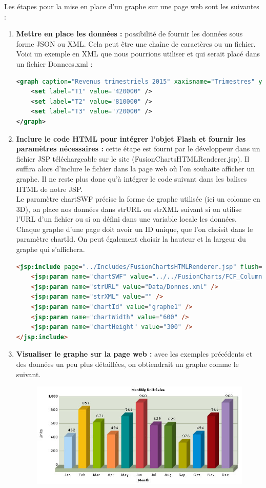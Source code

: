 Les étapes pour la mise en place d'un graphe sur une page web sont les suivantes :
\begin{enumerate}
 \item \textbf{Mettre en place les données :} possibilité de fournir les données sous forme JSON ou XML. Cela peut être une chaîne de caractères ou un fichier. Voici un exemple en XML que nous pourrions utiliser et qui serait placé dans un fichier Donnees.xml :
\begin{lstlisting}[language=XML]
<graph caption="Revenus trimestriels 2015" xaxisname="Trimestres" yaxisname="Revenus (euros)">
    <set label="T1" value="420000" />
    <set label="T2" value="810000" />
    <set label="T3" value="720000" />
</graph>
\end{lstlisting}
 \item \textbf{Inclure le code HTML pour intégrer l'objet Flash et fournir les paramètres nécessaires :} cette étape est fourni par le développeur dans un fichier JSP téléchargeable sur le site (FusionChartsHTMLRenderer.jsp). Il suffira alors d'inclure le fichier dans la page web où l'on souhaite afficher un graphe. Il ne reste plus donc qu'à intégrer le code suivant dans les balises HTML de notre JSP.\\
 Le paramètre chartSWF précise la forme de graphe utilisée (ici un colonne en 3D), on place nos données dans strURL ou strXML suivant si on utilise l'URL d'un fichier ou si on défini dans une variable locale les données.
 Chaque graphe d'une page doit avoir un ID unique, que l'on choisit dans le paramètre chartId. On peut également choisir la hauteur et la largeur du graphe qui s'affichera.
\begin{lstlisting}[language=HTML]
<jsp:include page="../Includes/FusionChartsHTMLRenderer.jsp" flush="true">
    <jsp:param name="chartSWF" value="../../FusionCharts/FCF_Column3D.swf" />
    <jsp:param name="strURL" value="Data/Donnes.xml" />
    <jsp:param name="strXML" value="" />
    <jsp:param name="chartId" value="graphe1" />
    <jsp:param name="chartWidth" value="600" />
    <jsp:param name="chartHeight" value="300" />
</jsp:include>
\end{lstlisting} 
 \item \textbf{Visualiser le graphe sur la page web :} avec les exemples précédents et des données un peu plus détaillées, on obtiendrait un graphe comme le suivant.
\begin{figure}[H]
  \center
  \includegraphics[scale=0.6]{../graph/fusionChartsExemple.jpg}

\end{figure}
\end{enumerate}
